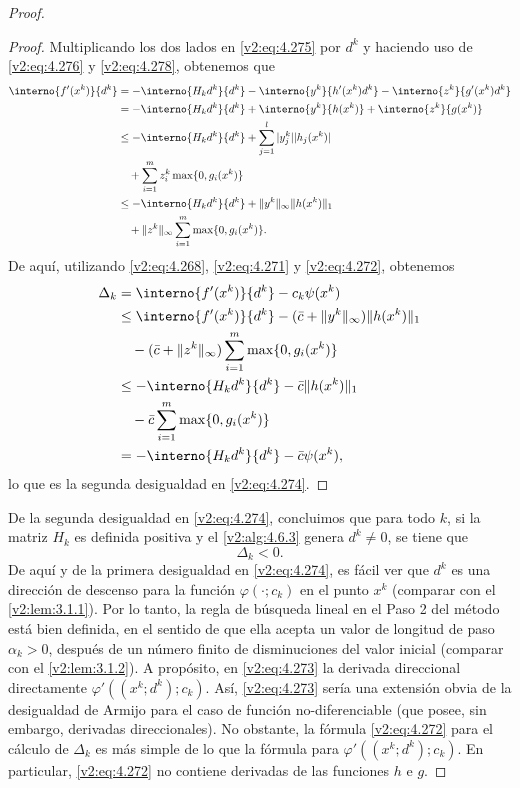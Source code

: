 \begin{proof}
\begin{proof}
Multiplicando los dos lados en \eqref{v2:eq:4.275} por $d^k$ y haciendo uso de \eqref{v2:eq:4.276} y \eqref{v2:eq:4.278}, obtenemos que
\begin{align*}
\interno{f'(x^k)}{d^k} &= -\interno{H_k d^k}{d^k} - \interno{y^k}{h'(x^k)d^k} - \interno{z^k}{g'(x^k)d^k} \\
&= -\interno{H_k d^k}{d^k} + \interno{y^k}{h(x^k)} + \interno{z^k}{g(x^k)} \\
&\le -\interno{H_k d^k}{d^k} + \sum_{j=1}^l |y^k_j| |h_j(x^k)| \\
&\quad + \sum_{i=1}^m z^k_i \max\{0, g_i(x^k)\} \\
&\le -\interno{H_k d^k}{d^k} + \|y^k\|_\infty \|h(x^k)\|_1 \\
&\quad + \|z^k\|_\infty \sum_{i=1}^m \max\{0, g_i(x^k)\}.
\end{align*}
De aquí, utilizando \eqref{v2:eq:4.268}, \eqref{v2:eq:4.271} y \eqref{v2:eq:4.272}, obtenemos
\begin{align*}
\Delta_k &= \interno{f'(x^k)}{d^k} - c_k \psi(x^k) \\
&\le \interno{f'(x^k)}{d^k} - (\bar{c} + \|y^k\|_\infty)\|h(x^k)\|_1 \\
&\quad - (\bar{c} + \|z^k\|_\infty) \sum_{i=1}^m \max\{0, g_i(x^k)\} \\
&\le -\interno{H_k d^k}{d^k} - \bar{c}\|h(x^k)\|_1 \\
&\quad - \bar{c} \sum_{i=1}^m \max\{0, g_i(x^k)\} \\
&= -\interno{H_k d^k}{d^k} - \bar{c}\psi(x^k),
\end{align*}
lo que es la segunda desigualdad en \eqref{v2:eq:4.274}.
\end{proof}

De la segunda desigualdad en \eqref{v2:eq:4.274}, concluimos que para todo $k$, si la matriz $H_k$ es definida positiva y el \cref{v2:alg:4.6.3} genera $d^k \neq 0$, se tiene que
\begin{equation}
\Delta_k < 0.
\label{v2:eq:4.279}
\end{equation}
De aquí y de la primera desigualdad en \eqref{v2:eq:4.274}, es fácil ver que $d^k$ es una dirección de descenso para la función $\varphi(\cdot; c_k)$ en el punto $x^k$ (comparar con el \cref{v2:lem:3.1.1}). Por lo tanto, la regla de búsqueda lineal en el Paso 2 del método está bien definida, en el sentido de que ella acepta un valor de longitud de paso $\alpha_k > 0$, después de un número finito de disminuciones del valor inicial (comparar con el \cref{v2:lem:3.1.2}). A propósito, en \eqref{v2:eq:4.273} la derivada direccional directamente $\varphi'((x^k; d^k); c_k)$. Así, \eqref{v2:eq:4.273} sería una extensión obvia de la desigualdad de Armijo para el caso de función no-diferenciable (que posee, sin embargo, derivadas direccionales). No obstante, la fórmula \eqref{v2:eq:4.272} para el cálculo de $\Delta_k$ es más simple de lo que la fórmula para $\varphi'((x^k; d^k); c_k)$. En particular, \eqref{v2:eq:4.272} no contiene derivadas de las funciones $h$ e $g$.


\end{proof}
